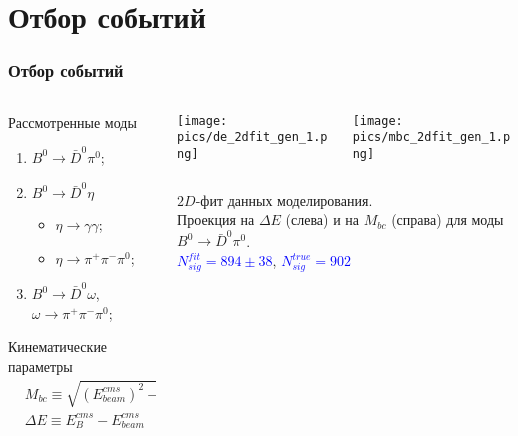 \documentclass[10 pt,compress,mathserif]{beamer}
\newcommand{\bdpi}{\ensuremath{B^0\to \bar D^0\pi^0}\xspace}
\newcommand{\bdeta}{\ensuremath{B^0\to \bar D^0\eta}\xspace}
\newcommand{\etagg}{\ensuremath{\eta\to \gamma\gamma}\xspace}
\newcommand{\etappp}{\ensuremath{\eta\to \pi^+\pi^-\pi^0}\xspace}
\newcommand{\bdomega}{\ensuremath{B^0\to \bar D^0\omega}\xspace}
\newcommand{\omegappp}{\ensuremath{\omega\to \pi^+\pi^-\pi^0}\xspace}
\begin{document}
\section{Отбор событий}
\begin{frame}
 \frametitle{Отбор событий}
 \begin{small}
 \begin{columns}
  \begin{column}{0.4\textwidth}
   \begin{block}{Рассмотренные моды}
    \begin{enumerate}
     \item \bdpi;
     \item \bdeta
     \begin{itemize}
      \item \etagg;
      \item \etappp;
     \end{itemize}
     \item \bdomega, \omegappp;
    \end{enumerate}
   \end{block}
   \begin{block}{Кинематические параметры}
     \begin{align*}
     & M_{bc} \equiv \sqrt{\left(E^{cms}_{beam}\right)^2-\left(p^{cms}_{B}\right)^2}\\
     &\Delta E \equiv E^{cms}_{B}-E^{cms}_{beam}
     \end{align*}
   \end{block}

  \end{column}
  \begin{column}{0.6\textwidth}
   \begin{columns}
    \begin{column}{0.5\textwidth}
   \begin{center}
    \texttt{[image: pics/de\_2dfit\_gen\_1.png]}
   \end{center}
  \end{column}
    \begin{column}{0.5\textwidth}
   \begin{center}
    \texttt{[image: pics/mbc\_2dfit\_gen\_1.png]}
   \end{center}
  \end{column}
   \end{columns}
   \begin{center}
    $2D$-фит данных моделирования.\\
    Проекция на $\Delta E$ (слева) и на $M_{bc}$ (справа) для моды \bdpi.\\
    \vspace{0.3 cm}
    \textcolor{blue}{$N_{sig}^{fit} = 894 \pm 38$}, \textcolor{blue}{$N_{sig}^{true} = 902$}
   \end{center}
   \end{column}
 \end{columns}
 \end{small}
\end{frame}
\end{document}
